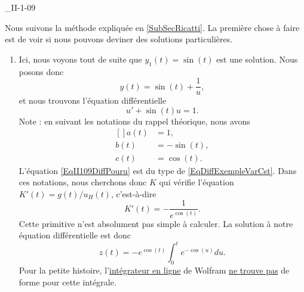 

\begin{corrige}{_II-1-09}

Nous suivons la méthode expliquée en \ref{SubSecRicatti}. La première chose à faire est de voir si nous pouvons deviner des solutions particulières.

\begin{enumerate}

\item 
Ici, nous voyons tout de suite que $y_1(t)=\sin(t)$ est une solution. Nous posons donc
\begin{equation}
	y(t)=\sin(t)+\frac{1}{ u },
\end{equation}
et nous trouvons l'équation différentielle
\begin{equation}		\label{EqII109DiffPouru}
	u'+\sin(t)u=1.
\end{equation}
Note : en suivant les notations du rappel théorique, nous avons
\begin{equation}
	\begin{aligned}[]
		a(t)	&=1,\\
		b(t)	&=-\sin(t),\\
		c(t)	&=\cos(t).
	\end{aligned}
\end{equation}
L'équation \eqref{EqII109DiffPouru} est du type de \eqref{EqDiffExempleVarCst}. Dans ces notations, nous cherchons donc $K$ qui vérifie l'équation $K'(t)=g(t)/u_H(t)$, c'est-à-dire
\begin{equation}
	K'(t)=-\frac{ 1 }{  e^{\cos(t)} }.
\end{equation}
Cette primitive n'est absolument pas simple à calculer. La solution à notre équation différentielle est donc 
\begin{equation}
	z(t)=- e^{\cos(t)}\int_0^t e^{-\cos(u)}du.
\end{equation}
Pour la petite histoire, l'\href{http://integrals.wolfram.com/index.jsp}{intégrateur en ligne} de Wolfram \href{http://reference.wolfram.com/mathematica/tutorial/IntegralsThatCanAndCannotBeDone.html}{ne trouve pas} de forme pour cette intégrale.


\end{enumerate}

\end{corrige}
